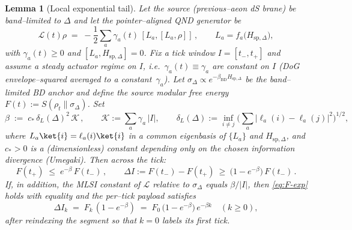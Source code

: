 \documentclass[10pt]{article}
\theoremstyle{definition}
\theoremstyle{plain}
\newtheorem{lemma}{Lemma}[section]
\begin{document}
\begin{lemma}[Local exponential tail]\label{lem:exp-tail}
Let the source (previous–aeon dS brane) be band–limited to $\Delta$ and let the pointer–aligned QND
generator be
\[
\mathcal L(t)\rho\;=\;-\frac12\sum_{a}\gamma_a(t)\,[L_a,[L_a,\rho]]\,,\qquad L_a=f_a\!\big(H_{\mathrm{sp},\Delta}\big),
\]
with $\gamma_a(t)\ge 0$ and $[L_a,H_{\mathrm{sp},\Delta}]=0$. Fix a tick window $I=[t_-,t_+]$ and assume a
\emph{steady actuator} regime on $I$, i.e.\ $\gamma_a(t)\equiv \gamma_a$ are constant on $I$ (DoG envelope–squared
averaged to a constant~$\gamma_a$). Let $\sigma_\Delta\propto e^{-\beta_{\mathrm{BD}}H_{\mathrm{sp},\Delta}}$ be the
band–limited BD anchor and define the source modular free energy $F(t):=S(\rho_t\|\sigma_\Delta)$. Set
\[
\beta\;:=\;c_\ast\,\delta_L(\Delta)^2\,\mathcal K\,,\qquad
\mathcal K:=\sum_a \gamma_a\,\big|I\big|,\qquad
\delta_L(\Delta):=\inf_{i\ne j}\Big(\sum_a \big|\ell_a(i)-\ell_a(j)\big|^2\Big)^{1/2},
\]
where $L_a\ket{i}=\ell_a(i)\ket{i}$ in a common eigenbasis of $\{L_a\}$ and $H_{\mathrm{sp},\Delta}$, and $c_\ast>0$
is a (dimensionless) constant depending only on the chosen information divergence (Umegaki). Then across the tick:
\begin{equation}\label{eq:F-exp}
F(t_+)\;\le\;e^{-\beta}\,F(t_-)\,,\qquad
\Delta I:=F(t_-)-F(t_+)\ \ge\ \big(1-e^{-\beta}\big)\,F(t_-)\,.
\end{equation}
If, in addition, the MLSI constant of $\mathcal L$ relative to $\sigma_\Delta$ equals $\beta/|I|$, then
\eqref{eq:F-exp} holds with equality and the per–tick payload satisfies
\begin{equation}\label{eq:tail-geom}
\Delta I_k\;=\;F_k\,(1-e^{-\beta})\;=\;F_0\,\big(1-e^{-\beta}\big)\,e^{-\beta k}\quad (k\ge 0),
\end{equation}
after reindexing the segment so that $k=0$ labels its first tick.
\end{lemma}
\end{document}
